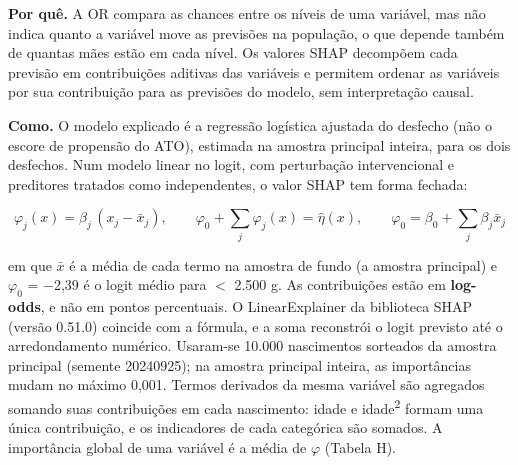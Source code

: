 \documentclass[10pt,a4paper]{article}
\newcommand{\menos}{\ensuremath{-}}
\newcommand{\menor}{\ensuremath{<}}
\begin{document}
{\color{iptescuro}\bfseries Por quê.} A OR compara as chances entre os níveis de uma variável, mas não indica quanto a variável move as previsões na população, o que depende também de quantas mães estão em cada nível. Os valores SHAP decompõem cada previsão em contribuições aditivas das variáveis e permitem ordenar as variáveis por sua contribuição para as previsões do modelo, sem interpretação causal.\par

{\color{iptescuro}\bfseries Como.} O modelo explicado é a regressão logística ajustada do desfecho (não o escore de propensão do ATO), estimada na amostra principal inteira, para os dois desfechos. Num modelo linear no logit, com perturbação intervencional e preditores tratados como independentes, o valor SHAP tem forma fechada:\par

\[\varphi_j(x)=\beta_j\,(x_j-\bar x_j),\qquad \varphi_0+\sum_j\varphi_j(x)=\hat\eta(x),\qquad \varphi_0=\beta_0+\sum_j\beta_j\bar x_j\]

em que \ensuremath{\bar x} é a média de cada termo na amostra de fundo (a amostra principal) e \ensuremath{\varphi_0} = \menos{}2,39 é o logit médio para \menor{} 2.500 g. As contribuições estão em \textbf{log-odds}, e não em pontos percentuais. O LinearExplainer da biblioteca SHAP (versão 0.51.0) coincide com a fórmula, e a soma reconstrói o logit previsto até o arredondamento numérico. Usaram-se 10.000 nascimentos sorteados da amostra principal (semente 20240925); na amostra principal inteira, as importâncias mudam no máximo 0,001. Termos derivados da mesma variável são agregados somando suas contribuições em cada nascimento: idade e idade\textsuperscript{2} formam uma única contribuição, e os indicadores de cada categórica são somados. A importância global de uma variável é a média de \textbar{}\ensuremath{\varphi}\textbar{} (Tabela H).\par
\end{document}
